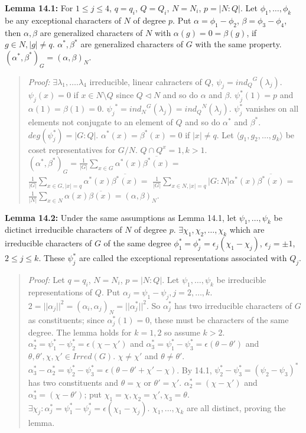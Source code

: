 {\bf Lemma 14.1:}  For $1 \leq j \leq 4$, $q= q_i$, $Q = Q_i$, $N=N_i$, $p=|N:Q|$.
Let $\phi_1 , \ldots , \phi_k$ be any exceptional characters of $N$ of degree $p$.
Put $\alpha = \phi_1 - \phi_2$,
$\beta = \phi_3 - \phi_4$, then $\alpha, \beta$ are generalized characters of $N$ with
$\alpha(g)=0=\beta(g)$, if $g \in N, |g| \ne q$. $\alpha^*, \beta^*$ are generalized characters of $G$
with the same property. $(\alpha^*, \beta^*)_G = (\alpha, \beta)_N$.
\begin{quote}
\emph{Proof:}
$\exists \lambda_1, \ldots. \lambda_4$ irreducible, linear cahracters of $Q$, $\psi_j= {ind_Q}^G(\lambda_j)$.
$\psi_j(x) = 0$ if $x \in N \setminus Q$ since $Q \lhd N$ and so do $\alpha$ and $\beta$.
$\psi_j^*(1)= p$ and $\alpha(1)=\beta(1) = 0$.  ${\psi_j}^* = {ind_N}^G(\lambda_j) = {ind_Q}^N(\lambda_j)$.
$\psi_j^*$ vanishes on all elements not conjugate to an element of $Q$ and so do $\alpha^*$ and $\beta^*$.
$deg(\psi_j^*)= |G:Q|$. $\alpha^*(x) = \beta^*(x) = 0$  if $|x| \ne q$.   Let $\langle g_1, g_2, \ldots , g_k \rangle$
be coset representatives for $G/N$.  $Q \cap Q^x =1, k > 1$.
$(\alpha^*, \beta^*)_G = {\frac 1 {|G|}} \sum_{x \in G} \alpha^*(x) {\overline {\beta^*(x)}} =$
${\frac 1 {|G|}} \sum_{x \in G, |x| = q} \alpha^*(x) {\overline {\beta^*(x)}} = $
${\frac 1 {|G|}} \sum_{x \in N, |x| = q} |G:N| \alpha^*(x) {\overline {\beta^*(x)}} = $
${\frac 1 {|N|}} \sum_{x \in N} \alpha(x) {\overline {\beta(x)}} = (\alpha, \beta)_N$.
\end{quote}
{\bf Lemma 14.2:} Under the same assumptions as Lemma 14.1, let $\psi_1, \ldots, \psi_k$ be dictinct irreducible
characters of $N$ of degree $p$.  $\exists \chi_1, \chi_2, \ldots , \chi_k$ which are irreducible characters of
$G$ of the same degree $\phi_1^*=\phi_j^* = \epsilon_j (\chi_1 - \chi_j)$, $\epsilon_j = \pm 1$, $2 \leq j \leq k$.
These $\psi_j^*$ are called the exceptional representations associated with $Q_j$.
\begin{quote}
\emph{Proof:}
Let $q=q_i$, $N=N_i$, $p=|N:Q|$.  Let $\psi_1, \ldots , \psi_k$ be irreducible representations of $Q$.
Put $\alpha_j = \psi_1 - \psi_j, j = 2,\ldots,k$.  $2=||\alpha_j||^2 = (\alpha_i, \alpha_j)_N=||\alpha_j^*||^2$.
So $\alpha_j^*$ has two irreducible characters of $G$ as constituents; since $\alpha_j^*(1)=0$, these must be characters
of the same degree.  The lemma holds for $k= 1, 2$ so assume $k>2$.
$\alpha_2^* = \psi_1^* -\psi_2^*= \epsilon (\chi - \chi')$ and
$\alpha_3^* = \psi_1^* -\psi_3^*= \epsilon (\theta - \theta')$ and $\theta, \theta', \chi, \chi' \in Irred(G)$.
$\chi \ne \chi'$ and $\theta \ne \theta'$.
$\alpha_3^* - \alpha_2^* = \psi_2^* - \psi_3^* = \epsilon (\theta - \theta' +\chi' - \chi)$.  By 14.1, 
$\psi_2^* - \psi_3^* = (\psi_2 - \psi_3)^*$ has two constituents and $\theta=\chi$ or $\theta'= \chi'$.
$\alpha_2^* = (\chi - \chi')$ and
$\alpha_3^* = (\chi - \theta')$; put $\chi_1 = \chi, \chi_2 = \chi', \chi_3 = \theta$.
$\exists \chi_j: \alpha_j^* = \psi_1^* - \psi_j^* = \epsilon (\chi_1 - \chi_j)$.  $\chi_1, \ldots, \chi_k$ are all
distinct, proving the lemma.
\end{quote}
